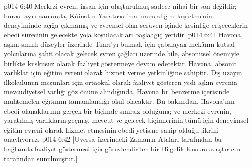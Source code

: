 \vs p014 6:40 Merkezi evren, insan için oluşturulmuş sadece nihai bir son değildir; burası aynı zamanda, Kâinatın Yaratıcısı’nın sınırsızlığını keşfetmenin deneyiminde açığa çıkmamış ve evrensel olan serüven içinde kesinliğe erişeceklerin ebedi sürecinin gelecekte yola koyulacakları başlangıç yeridir.
\vs p014 6:41 Havona, aşkın sınırlı düzeyler üzerinde Tanrı’yı bulmak için çabalayan mekânın kutsal yolcularına şahit olacak gelecek evren çağları üzerinde bile, absonitsel önemiyle birlikte kuşkusuz olarak faaliyet göstermeye devam edecektir. Havona, absonit varlıklar için eğitim evreni olarak hizmet verme yetkinliğine sahiptir. Dış uzayın ilkokulunun mezunları için ortaokul olarak faaliyet gösteren yedi aşkın evrenin mevcudiyetsel varlığı göz önüne alındığında, Havona bu benzetme içerisinde muhtemelen eğitimin tamamlandığı okul olacaktır. Bu bakımdan, Havona’nın ebedi olanaklarının gerçek bir biçimde sınırsız olduğuna; ve merkezi evrenin, yaratılmış varlıkların geçmiş, mevcut ve gelecek biçimlerinin tümü için deneyimsel eğitim evreni olarak hizmet etmesinin ebedi yetisine sahip olduğu fikrini onaylıyoruz.
\vs p014 6:42 [Uversa üzerindeki Zamanın Ataları tarafından bu bağlamda faaliyet göstermesi için görevlendirilen bir Bilgelik Kusursuzlaştırıcısı tarafından sunulmuştur.]
